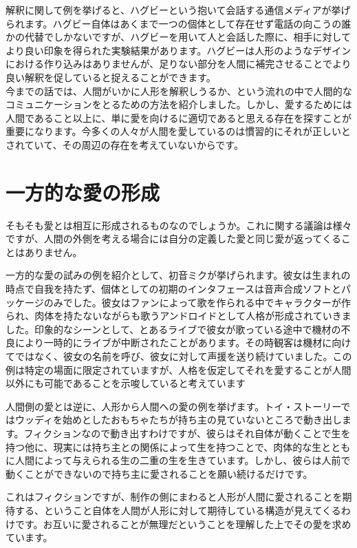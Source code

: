 \documentclass[b5j,twoside,twocolumn]{utarticle}
\begin{document}
解釈に関して例を挙げると、ハグビーという抱いて会話する通信メディアが挙げられます。ハグビー自体はあくまで一つの個体として存在せず電話の向こうの誰かの代替でしかないですが、ハグビーを用いて人と会話した際に、相手に対してより良い印象を得られた実験結果があります。ハグビーは人形のようなデザインにおける作り込みはありませんが、足りない部分を人間に補完させることでより良い解釈を促していると捉えることができます。\\


今までの話では、人間がいかに人形を解釈しうるか、という流れの中で人間的なコミュニケーションをとるための方法を紹介しました。しかし、愛するためには人間であること以上に、単に愛を向けるに適切であると思える存在を探すことが重要になります。今多くの人々が人間を愛しているのは慣習的にそれが正しいとされていて、その周辺の存在を考えていないからです。

\section*{一方的な愛の形成}
そもそも愛とは相互に形成されるものなのでしょうか。これに関する議論は様々ですが、人間の外側を考える場合には自分の定義した愛と同じ愛が返ってくることはありません。


一方的な愛の試みの例を紹介として、初音ミクが挙げられます。彼女は生まれの時点で自我を持たず、個体としての初期のインタフェースは音声合成ソフトとパッケージのみでした。彼女はファンによって歌を作られる中でキャラクターが作られ、肉体を持たないながらも歌うアンドロイドとして人格が形成されていきました。印象的なシーンとして、とあるライブで彼女が歌っている途中で機材の不良により一時的にライブが中断されたことがあります。その時観客は機材に向けてではなく、彼女の名前を呼び、彼女に対して声援を送り続けていました。この例は特定の場面に限定されていますが、人格を仮定してそれを愛することが人間以外にも可能であることを示唆していると考えています


人間側の愛とは逆に、人形から人間への愛の例を挙げます。トイ・ストーリーではウッディを始めとしたおもちゃたちが持ち主の見ていないところで動き出します。フィクションなので動き出すわけですが、彼らはそれ自体が動くことで生を持つ他に、現実には持ち主との関係によって生を持つことで、肉体的な生とともに人間によって与えられる生の二重の生を生きています。しかし、彼らは人前で動くことができないので持ち主に愛されることを願い続けるだけです。


これはフィクションですが、制作の側にまわると人形が人間に愛されることを期待する、ということ自体を人間が人形に対して期待している構造が見えてくるわけです。お互いに愛されることが無理だということを理解した上でその愛を求めています。
\end{document}
